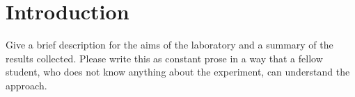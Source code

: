 
\section{Introduction}
\label{sec:introduction}
Give a brief description for the aims of the laboratory and a summary of the results collected.
Please write this as constant prose in a way that a fellow student,
who does not know anything about the experiment,
can understand the approach.
